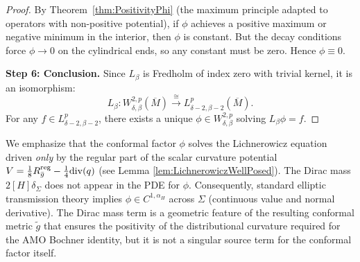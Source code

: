\begin{proof}
By Theorem~\ref{thm:PositivityPhi} (the maximum principle adapted to operators with non-positive potential), if $\phi$ achieves a positive maximum or negative minimum in the interior, then $\phi$ is constant. But the decay conditions force $\phi \to 0$ on the cylindrical ends, so any constant must be zero. Hence $\phi \equiv 0$.

\medskip\noindent
\textbf{Step 6: Conclusion.}
Since $L_\beta$ is Fredholm of index zero with trivial kernel, it is an isomorphism:
\[
    L_\beta : W^{2,p}_{\delta,\beta}(\overline{M}) \xrightarrow{\cong} L^p_{\delta-2,\beta-2}(\overline{M}).
\]
For any $f \in L^p_{\delta-2,\beta-2}$, there exists a unique $\phi \in W^{2,p}_{\delta,\beta}$ solving $L_\beta \phi = f$.
\end{proof}

\begin{remark}
\label{rem:RegularityConsistency}
We emphasize that the conformal factor $\phi$ solves the Lichnerowicz equation driven \emph{only} by the regular part of the scalar curvature potential $V = \frac{1}{8}R^{\mathrm{reg}}_{\bar{g}} - \frac{1}{4}\mathrm{div}(q)$ (see Lemma \ref{lem:LichnerowiczWellPosed}). The Dirac mass $2[H]\delta_\Sigma$ does not appear in the PDE for $\phi$. Consequently, standard elliptic transmission theory implies $\phi \in C^{1,\alpha_H}$ across $\Sigma$ (continuous value and normal derivative). The Dirac mass term is a geometric feature of the resulting conformal metric $\tilde{g}$ that ensures the positivity of the distributional curvature required for the AMO Bochner identity, but it is not a singular source term for the conformal factor itself.
\end{remark}

